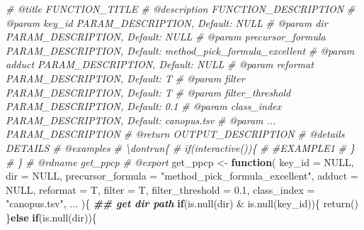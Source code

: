 \documentclass[
]{article}
\newenvironment{Shaded}{\begin{snugshade}}{\end{snugshade}}
\newcommand{\AttributeTok}[1]{\textcolor[rgb]{0.77,0.63,0.00}{#1}}
\newcommand{\CommentTok}[1]{\textcolor[rgb]{0.56,0.35,0.01}{\textit{#1}}}
\newcommand{\ConstantTok}[1]{\textcolor[rgb]{0.00,0.00,0.00}{#1}}
\newcommand{\ControlFlowTok}[1]{\textcolor[rgb]{0.13,0.29,0.53}{\textbf{#1}}}
\newcommand{\DocumentationTok}[1]{\textcolor[rgb]{0.56,0.35,0.01}{\textbf{\textit{#1}}}}
\newcommand{\FloatTok}[1]{\textcolor[rgb]{0.00,0.00,0.81}{#1}}
\newcommand{\FunctionTok}[1]{\textcolor[rgb]{0.00,0.00,0.00}{#1}}
\newcommand{\NormalTok}[1]{#1}
\newcommand{\OtherTok}[1]{\textcolor[rgb]{0.56,0.35,0.01}{#1}}
\newcommand{\SpecialCharTok}[1]{\textcolor[rgb]{0.00,0.00,0.00}{#1}}
\newcommand{\StringTok}[1]{\textcolor[rgb]{0.31,0.60,0.02}{#1}}
\begin{document}
\begin{Shaded}
\begin{Highlighting}[]
\CommentTok{\#\textquotesingle{} @title FUNCTION\_TITLE}
\CommentTok{\#\textquotesingle{} @description FUNCTION\_DESCRIPTION}
\CommentTok{\#\textquotesingle{} @param key\_id PARAM\_DESCRIPTION, Default: NULL}
\CommentTok{\#\textquotesingle{} @param dir PARAM\_DESCRIPTION, Default: NULL}
\CommentTok{\#\textquotesingle{} @param precursor\_formula PARAM\_DESCRIPTION, Default: \textquotesingle{}method\_pick\_formula\_excellent\textquotesingle{}}
\CommentTok{\#\textquotesingle{} @param adduct PARAM\_DESCRIPTION, Default: NULL}
\CommentTok{\#\textquotesingle{} @param reformat PARAM\_DESCRIPTION, Default: T}
\CommentTok{\#\textquotesingle{} @param filter PARAM\_DESCRIPTION, Default: T}
\CommentTok{\#\textquotesingle{} @param filter\_threshold PARAM\_DESCRIPTION, Default: 0.1}
\CommentTok{\#\textquotesingle{} @param class\_index PARAM\_DESCRIPTION, Default: \textquotesingle{}canopus.tsv\textquotesingle{}}
\CommentTok{\#\textquotesingle{} @param ... PARAM\_DESCRIPTION}
\CommentTok{\#\textquotesingle{} @return OUTPUT\_DESCRIPTION}
\CommentTok{\#\textquotesingle{} @details DETAILS}
\CommentTok{\#\textquotesingle{} @examples }
\CommentTok{\#\textquotesingle{} \textbackslash{}dontrun\{}
\CommentTok{\#\textquotesingle{} if(interactive())\{}
\CommentTok{\#\textquotesingle{}  \#EXAMPLE1}
\CommentTok{\#\textquotesingle{}  \}}
\CommentTok{\#\textquotesingle{} \}}
\CommentTok{\#\textquotesingle{} @rdname get\_ppcp}
\CommentTok{\#\textquotesingle{} @export }
\NormalTok{get\_ppcp }\OtherTok{\textless{}{-}} 
  \ControlFlowTok{function}\NormalTok{(}
           \AttributeTok{key\_id =} \ConstantTok{NULL}\NormalTok{,}
           \AttributeTok{dir =} \ConstantTok{NULL}\NormalTok{,}
           \AttributeTok{precursor\_formula =} \StringTok{"method\_pick\_formula\_excellent"}\NormalTok{,}
           \AttributeTok{adduct =} \ConstantTok{NULL}\NormalTok{,}
           \AttributeTok{reformat =}\NormalTok{ T,}
           \AttributeTok{filter =}\NormalTok{ T,}
           \AttributeTok{filter\_threshold =} \FloatTok{0.1}\NormalTok{,}
           \AttributeTok{class\_index =} \StringTok{"canopus.tsv"}\NormalTok{,}
\NormalTok{           ...}
\NormalTok{           )\{}
    \DocumentationTok{\#\# get dir path}
    \ControlFlowTok{if}\NormalTok{(}\FunctionTok{is.null}\NormalTok{(dir) }\SpecialCharTok{\&} \FunctionTok{is.null}\NormalTok{(key\_id))\{}
      \FunctionTok{return}\NormalTok{()}
\NormalTok{    \}}\ControlFlowTok{else} \ControlFlowTok{if}\NormalTok{(}\FunctionTok{is.null}\NormalTok{(dir))\{}

\end{Highlighting}
\end{Shaded}
\end{document}
